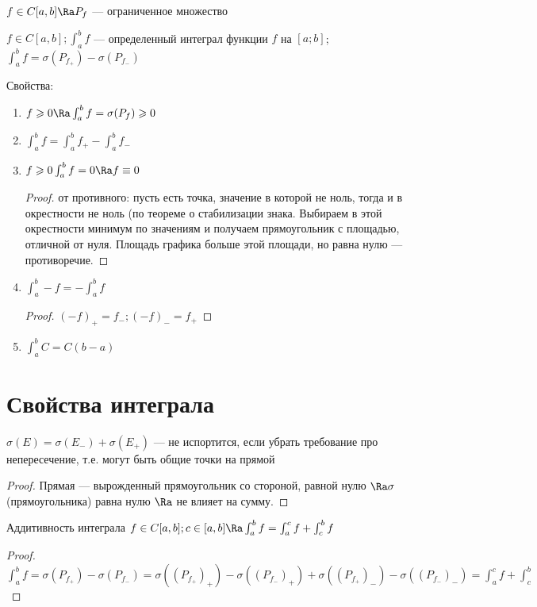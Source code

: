 \begin{Rem}
	$f \in C[a, b] \Ra P_f $ --- ограниченное множество
\end{Rem}

\begin{Def}
	$f \in C[a, b]; \int_a^b f$ --- определенный интеграл функции $ f$ на $[a; b]$; $\int_a^b f = \sigma (P_{f_+}) - \sigma (P_{f_-}) $
\end{Def}
Свойства:
\begin{enumerate}
\item 
	$f \geqslant 0 \Ra \int_a^b f = \sigma(P_f) \geqslant 0$
	
\item 
	$\int_a^b f  = \int_a^b f_+ - \int_a^b f_- $

\item 
	$f \geqslant 0 \int_a^b f = 0 \Ra f \equiv 0$
	\begin{proof}
		от противного: пусть есть точка, значение в которой не ноль, тогда и в окрестности не ноль (по теореме о стабилизации знака.
		Выбираем в этой окрестности минимум по значениям и получаем прямоугольник с площадью, отличной от нуля.
		Площадь графика больше этой площади, но равна нулю --- противоречие.
	\end{proof} 

\item 
	$\int_a^b -f = - \int_a^b f$
	\begin{proof}
		$(-f)_+ = f_- ; (-f)_- = f_+ $
	\end{proof} 

\item 
	$\int_a^b C = C(b - a)$

\end{enumerate}

\section{Свойства интеграла}

\begin{Rem}
	$ \sigma (E) = \sigma (E_-) + \sigma (E_+) $ --- не испортится, если убрать требование про непересечение, т.е. могут быть общие точки на прямой
\end{Rem}
\begin{proof}
	Прямая --- вырожденный прямоугольник со стороной, равной нулю $ \Ra \sigma $ (прямоугольника) равна нулю $ \Ra $ не влияет на сумму.
\end{proof}

\begin{theorem}{Аддитивность интеграла}
	$f \in C[a, b]; c \in [a, b] \Ra \int_a^b f = \int_a^c f + \int_c^b f$
\end{theorem}
\begin{proof}
	$ \int_a^b f = \sigma (P_{f_+}) - \sigma (P_{f_-}) = \sigma ((P_{f_+})_+) - \sigma ((P_{f_-})_+) + \sigma ((P_{f_+})_-) - \sigma ((P_{f_-})_-) = \int_a^c f + \int_c^b $
\end{proof}

